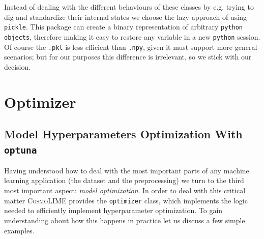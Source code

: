 Instead of dealing with the different behaviours of these classes by e.g. trying to dig and standardize their internal states we choose the lazy approach of using \texttt{pickle}. This package can create a binary representation of arbitrary \texttt{python objects}, therefore making it easy to restore any variable in a new \texttt{python} session. Of course the \texttt{.pkl} is less efficient than \texttt{.npy}, given it must support more general scenarios; but for our purposes this difference is irrelevant, so we stick with our decision.

\section{Optimizer}


\subsection{Model Hyperparameters Optimization With \texttt{optuna}}
Having understood how to deal with the most important parts of any machine learning application (the dataset and the preprocessing) we turn to the third most important aspect: \emph{model optimization}. In order to deal with this critical matter \textsc{CosmoLIME} provides the \texttt{optimizer} class, which implements the logic needed to efficiently implement hyperparameter optimization. To gain understanding about how this happens in practice let us discuss a few simple examples.

